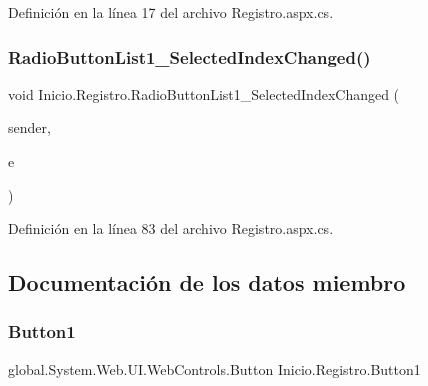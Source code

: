 Definición en la línea 17 del archivo Registro.\+aspx.\+cs.


\begin{DoxyCode}{0}

\end{DoxyCode}
\mbox{\label{classInicio_1_1Registro_a3622e0de22647c232c2d664a90cb9798}} 
\subsubsection{\texorpdfstring{RadioButtonList1\_SelectedIndexChanged()}{RadioButtonList1\_SelectedIndexChanged()}}
{\footnotesize\ttfamily void Inicio.\+Registro.\+Radio\+Button\+List1\+\_\+\+Selected\+Index\+Changed (\begin{DoxyParamCaption}\item[{object}]{sender,  }\item[{Event\+Args}]{e }\end{DoxyParamCaption})\hspace{0.3cm}{\ttfamily [protected]}}



Definición en la línea 83 del archivo Registro.\+aspx.\+cs.


\begin{DoxyCode}{0}

\end{DoxyCode}


\subsection{Documentación de los datos miembro}
\mbox{\label{classInicio_1_1Registro_aa0ba82a780d379b638a877027de7a61b}} 
\subsubsection{\texorpdfstring{Button1}{Button1}}
{\footnotesize\ttfamily global.\+System.\+Web.\+U\+I.\+Web\+Controls.\+Button Inicio.\+Registro.\+Button1\hspace{0.3cm}{\ttfamily [protected]}}



